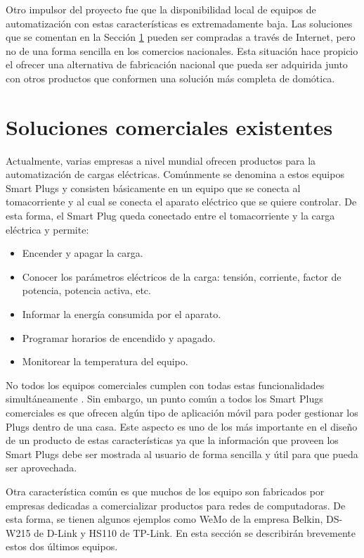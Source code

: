 Otro impulsor del proyecto fue que la disponibilidad local de equipos de automatización con estas características es extremadamente baja. Las soluciones que se comentan en la Sección \ref{section:soluciones_comerciales} pueden ser compradas a través de Internet, pero no de una forma sencilla en los comercios nacionales. Esta situación hace propicio el ofrecer una alternativa de fabricación nacional que pueda ser adquirida junto con otros productos que conformen una solución más completa de domótica.



\section{Soluciones comerciales existentes}
\label{section:soluciones_comerciales}

Actualmente, varias empresas a nivel mundial ofrecen productos para la automatización de cargas eléctricas. Comúnmente se denomina a estos equipos Smart Plugs y consisten básicamente en un equipo que se conecta al tomacorriente y al cual se conecta el aparato eléctrico que se quiere controlar. De esta forma, el Smart Plug queda conectado entre el tomacorriente y la carga eléctrica y permite:

\begin{itemize}
\item Encender y apagar la carga.
\item Conocer los parámetros eléctricos de la carga: tensión, corriente, factor de potencia, potencia activa, etc.
\item Informar la energía consumida por el aparato.
\item Programar horarios de encendido y apagado.
\item Monitorear la temperatura del equipo.
\end{itemize}

No todos los equipos comerciales cumplen con todas estas funcionalidades simultáneamente . Sin embargo, un punto común a todos los Smart Plugs comerciales es que ofrecen algún tipo de aplicación móvil para poder gestionar los Plugs dentro de una casa. Este aspecto es uno de los más importante en el diseño de un producto de estas características ya que la información que proveen los Smart Plugs debe ser mostrada al usuario de forma sencilla y útil para que pueda ser aprovechada.

Otra característica común es que muchos de los equipo son fabricados por empresas dedicadas a comercializar productos para redes de computadoras. De esta forma, se tienen algunos ejemplos como WeMo de la empresa Belkin, DS-W215 de D-Link y HS110 de TP-Link. En esta sección se describirán brevemente estos dos últimos equipos.

